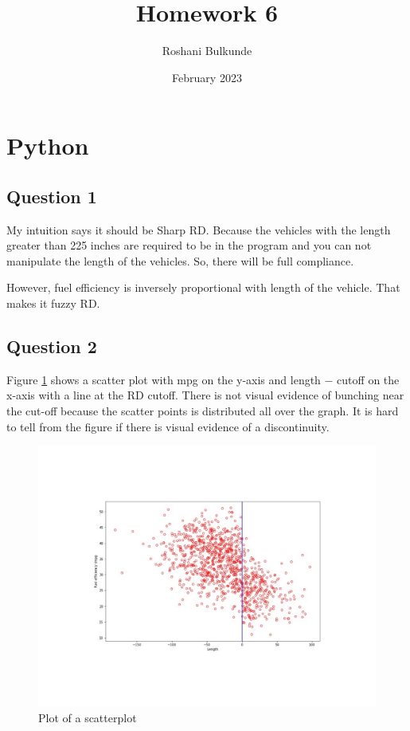 \documentclass{article}
\title{Homework 6}
\author{Roshani Bulkunde}
\date{February 2023}
\begin{document}
\maketitle

\section{Python}

\subsection{Question 1}
My intuition says it should be Sharp RD. Because the vehicles with the length greater than 225 inches are required to be in the program and you can not manipulate the length of the vehicles. So, there will be full compliance. 

However, fuel efficiency is inversely proportional with length of the vehicle. That makes it fuzzy RD.
 

\subsection{Question 2}
Figure \ref{fig:discontinuity_2} shows a scatter plot with mpg on the y-axis and length − cutoff on the x-axis with a line at the RD cutoff. There is not visual evidence of bunching near the cut-off because the scatter points is distributed all over the graph. It is hard to tell from the figure if there is visual evidence of a discontinuity.

\begin{figure}[ht]
    \centering
    \includegraphics[scale = 0.7]{discontinuity_2.pdf}
    \caption{Plot of a scatterplot}
    \label{fig:discontinuity_2}
\end{figure}
\end{document}
